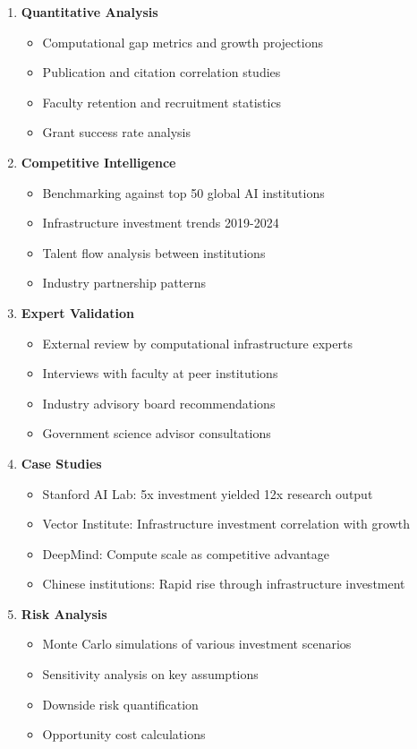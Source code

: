 \documentclass{article}
\begin{document}
\begin{enumerate}
\item \textbf{Quantitative Analysis}
   \begin{itemize}
   \item Computational gap metrics and growth projections
   \item Publication and citation correlation studies
   \item Faculty retention and recruitment statistics
   \item Grant success rate analysis
   \end{itemize}

\item \textbf{Competitive Intelligence}
   \begin{itemize}
   \item Benchmarking against top 50 global AI institutions
   \item Infrastructure investment trends 2019-2024
   \item Talent flow analysis between institutions
   \item Industry partnership patterns
   \end{itemize}

\item \textbf{Expert Validation}
   \begin{itemize}
   \item External review by computational infrastructure experts
   \item Interviews with faculty at peer institutions
   \item Industry advisory board recommendations
   \item Government science advisor consultations
   \end{itemize}

\item \textbf{Case Studies}
   \begin{itemize}
   \item Stanford AI Lab: 5x investment yielded 12x research output
   \item Vector Institute: Infrastructure investment correlation with growth
   \item DeepMind: Compute scale as competitive advantage
   \item Chinese institutions: Rapid rise through infrastructure investment
   \end{itemize}

\item \textbf{Risk Analysis}
   \begin{itemize}
   \item Monte Carlo simulations of various investment scenarios
   \item Sensitivity analysis on key assumptions
   \item Downside risk quantification
   \item Opportunity cost calculations
   \end{itemize}
\end{enumerate}
\end{document}

